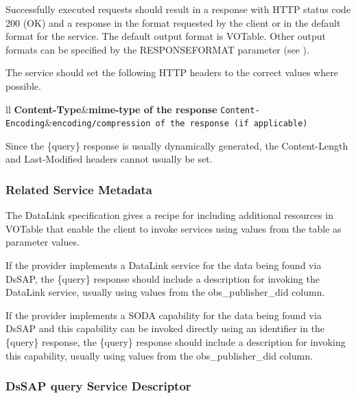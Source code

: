 \documentclass[11pt,a4paper]{ivoa}
\begin{document}
Successfully executed requests should result in a response with HTTP status code 200 (OK) and a response in the format requested by the client or in the default format for the service. The default output format is VOTable. Other output formats can be specified by the RESPONSEFORMAT parameter (see \cite{std:DALI}).

The service should set the following HTTP headers to the correct values where possible.
\begin{table}[H]
\begin{tabular}{ll}
\sptablerule
\textbf{Content-Type}&\textbf{mime-type of the response}\cr
\sptablerule
\texttt{Content-Encoding}&\texttt{encoding/compression of the response (if applicable)}\cr
\sptablerule
\end{tabular}
\caption{Recommended HTTP Response Headers}
\label{tab:RespHead}
\end{table}





Since the \{query\} response is usually dynamically generated, the Content-Length and Last-Modified headers cannot usually be set.

\subsubsection{Related Service Metadata}
The DataLink specification  gives a recipe for including additional resources in VOTable that enable the client to invoke services using values from the table as parameter values. 

If the provider implements a DataLink service for the data being found via DsSAP, the \{query\} response should include a description for invoking the DataLink service, usually using values from the obs\_publisher\_did column.
 
If the provider implements a SODA capability for the data being found via DsSAP and this capability can be invoked directly using an identifier in the \{query\} response, the \{query\} response should include a description for invoking this capability, usually using values from the obs\_publisher\_did column.



\subsubsection{DsSAP {query} Service Descriptor}
\end{document}
